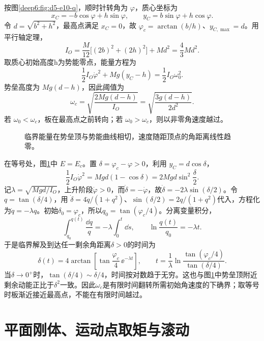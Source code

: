 \begin{solution}
按图\ref{deep6:fig:d5-e10-q}，顺时针转角为 $\varphi$，质心坐标为
\[
x_C=-b\cos\varphi+h\sin\varphi,\qquad
y_C=b\sin\varphi+h\cos\varphi.
\]
令 $d=\sqrt{b^2+h^2}$，最高点满足 $x_C=0$，故 $\varphi_c=\arctan(b/h)$、$y_{C,\max}=d$。用平行轴定理，
\[
I_O=\frac M{12}\big[(2b)^2+(2h)^2\big]+Md^2
=\frac43Md^2.
\]
取质心初始高度h为势能零点，能量方程为
\[
\frac12I_O\dot\varphi^2+Mg(y_C-h)=\frac12I_O\omega_0^2.
\]
势垒高度为 $Mg(d-h)$，因此阈值为
\[
\omega_c=\sqrt{\frac{2Mg(d-h)}{I_O}}
=\sqrt{\frac{3g(d-h)}{2d^2}}.
\]
若 $\omega_0<\omega_c$，板在最高点之前转向；若 $\omega_0>\omega_c$，则以非零角速度越过。
\begin{figure}[H]\centering
{}
\caption{临界能量在势垒顶与势能曲线相切，速度随距顶点的角距离线性趋零。}\label{deep6:fig:d5-e10-s}
\end{figure}
在等号处，图\ref{deep6:fig:d5-e10-s}中 $E=E_c$。置 $\delta=\varphi_c-\varphi>0$，利用 $y_C=d\cos\delta$，
\[
\frac12I_O\dot\varphi^2=Mg d(1-\cos\delta)
=2Mgd\sin^2\frac\delta2.
\]
记$\lambda=\sqrt{Mgd/I_O}$，上升阶段$\dot\varphi>0$，而$\dot\delta=-\dot\varphi$，故$\dot\delta=-2\lambda\sin(\delta/2)$。令$q=\tan(\delta/4)$，用
$\dot\delta=4\dot q/(1+q^2)$、$\sin(\delta/2)=2q/(1+q^2)$代入，方程化为$\dot q=-\lambda q$。初始$\delta_0=\varphi_c$，所以$q_0=\tan(\varphi_c/4)$。分离变量积分，
\[
\int_{q_0}^{q(t)}\frac{\dd q}{q}=-\lambda\int_0^t\dd s,
\qquad \ln\frac{q(t)}{q_0}=-\lambda t.
\]
于是临界解及到达任一剩余角距离$\delta>0$的时间为
\[
\delta(t)=4\arctan\!\left[\tan\frac{\varphi_c}{4}\,\ee^{-\lambda t}\right],
\qquad
t=\frac1\lambda\ln\frac{\tan(\varphi_c/4)}{\tan(\delta/4)}.
\]
当$\delta\to0^+$时，$\tan(\delta/4)\sim\delta/4$，时间按对数趋于无穷。这也与图\ref{deep6:fig:d5-e10-s}中势垒顶附近剩余动能正比于$\delta^2$一致。因此$\omega_c$是有限时间翻转所需初始角速度的下确界；取等号时板渐近接近最高点，不能在有限时间越过。
\end{solution}



\section{平面刚体、运动点取矩与滚动}

